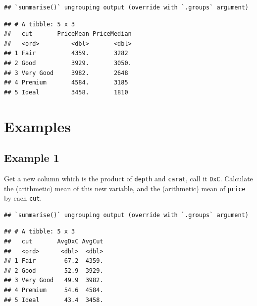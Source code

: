 \documentclass[
]{book}
\newenvironment{Shaded}{\begin{snugshade}}{\end{snugshade}}
\newcommand{\DataTypeTok}[1]{\textcolor[rgb]{0.13,0.29,0.53}{#1}}
\newcommand{\KeywordTok}[1]{\textcolor[rgb]{0.13,0.29,0.53}{\textbf{#1}}}
\newcommand{\NormalTok}[1]{#1}
\newcommand{\OperatorTok}[1]{\textcolor[rgb]{0.81,0.36,0.00}{\textbf{#1}}}
\newcommand{\StringTok}[1]{\textcolor[rgb]{0.31,0.60,0.02}{#1}}
\begin{document}
\begin{verbatim}
## `summarise()` ungrouping output (override with `.groups` argument)
\end{verbatim}

\begin{verbatim}
## # A tibble: 5 x 3
##   cut       PriceMean PriceMedian
##   <ord>         <dbl>       <dbl>
## 1 Fair          4359.       3282 
## 2 Good          3929.       3050.
## 3 Very Good     3982.       2648 
## 4 Premium       4584.       3185 
## 5 Ideal         3458.       1810
\end{verbatim}

\hypertarget{examples-2}{%
\section{Examples}\label{examples-2}}

\hypertarget{example-1-1}{%
\subsection{Example 1}\label{example-1-1}}

Get a new column which is the product of \texttt{depth} and \texttt{carat}, call it \texttt{DxC}. Calculate the (arithmetic) mean of this new variable, and the (arithmetic) mean of \texttt{price} by each \texttt{cut}.

\begin{Shaded}
\end{Shaded}

\begin{verbatim}
## `summarise()` ungrouping output (override with `.groups` argument)
\end{verbatim}

\begin{verbatim}
## # A tibble: 5 x 3
##   cut       AvgDxC AvgCut
##   <ord>      <dbl>  <dbl>
## 1 Fair        67.2  4359.
## 2 Good        52.9  3929.
## 3 Very Good   49.9  3982.
## 4 Premium     54.6  4584.
## 5 Ideal       43.4  3458.
\end{verbatim}
\end{document}
